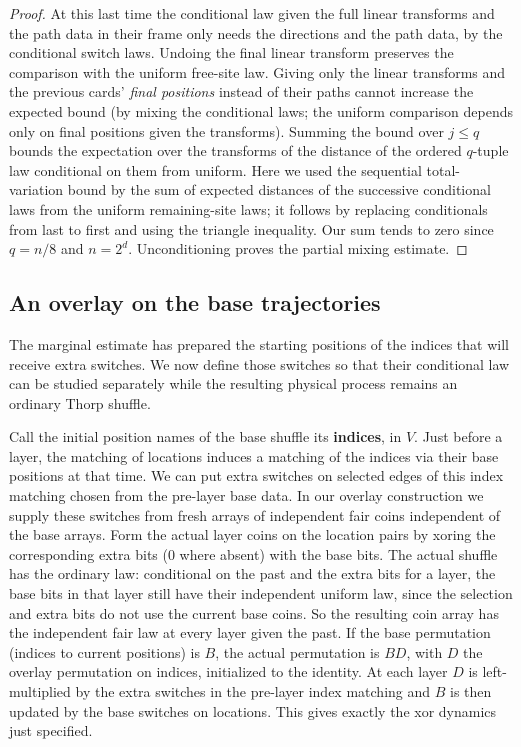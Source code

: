 \begin{proof}
At this last time the conditional law given the full linear transforms and the path data in their frame only needs the directions and the path data, by the conditional switch laws. Undoing the final linear transform preserves the comparison with the uniform free-site law. Giving only the linear transforms and the previous cards' \emph{final positions} instead of their paths cannot increase the expected bound (by mixing the conditional laws; the uniform comparison depends only on final positions given the transforms). Summing the bound over \(j\le q\) bounds the expectation over the transforms of the distance of the ordered \(q\)-tuple law conditional on them from uniform. Here we used the sequential total-variation bound by the sum of expected distances of the successive conditional laws from the uniform remaining-site laws; it follows by replacing conditionals from last to first and using the triangle inequality. Our sum tends to zero since \(q=n/8\) and \(n=2^d\). Unconditioning proves the partial mixing estimate.
\end{proof}

\subsection{An overlay on the base trajectories}

The marginal estimate has prepared the starting positions of the indices that will receive extra switches. We now define those switches so that their conditional law can be studied separately while the resulting physical process remains an ordinary Thorp shuffle.

Call the initial position names of the base shuffle its \textbf{indices}, in \(V\). Just before a layer, the matching of locations induces a matching of the indices via their base positions at that time. We can put extra switches on selected edges of this index matching chosen from the pre-layer base data. In our overlay construction we supply these switches from fresh arrays of independent fair coins independent of the base arrays. Form the actual layer coins on the location pairs by xoring the corresponding extra bits (0 where absent) with the base bits. The actual shuffle has the ordinary law: conditional on the past and the extra bits for a layer, the base bits in that layer still have their independent uniform law, since the selection and extra bits do not use the current base coins. So the resulting coin array has the independent fair law at every layer given the past. If the base permutation (indices to current positions) is \(B\), the actual permutation is \(B D\), with \(D\) the overlay permutation on indices, initialized to the identity. At each layer \(D\) is left-multiplied by the extra switches in the pre-layer index matching and \(B\) is then updated by the base switches on locations. This gives exactly the xor dynamics just specified.

